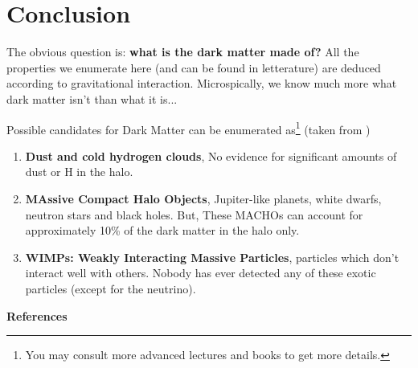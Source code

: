 \documentclass[12pt, letterpaper, twocolumn]{article}
\begin{document}
\section{\textbf{Conclusion}}

The obvious question is: \textbf{what is the dark matter made of?} All the properties we enumerate here (and can be found in letterature) are deduced according to gravitational interaction. Microspically, we know much more what dark matter isn't than what it is...

Possible candidates for Dark Matter can be enumerated as\footnote{You may consult more advanced lectures and books to get more details.} (taken from \cite{last})
\begin{enumerate}
\item \textbf{Dust and cold hydrogen clouds}, No evidence for significant amounts of dust or H in the halo. 
\item \textbf{MAssive Compact Halo Objects}, Jupiter-like planets, white dwarfs, neutron stars and black holes. But, These MACHOs can account for approximately 10\% of the dark matter in the halo only.
\item \textbf{WIMPs: Weakly Interacting Massive Particles}, particles which don't interact well with others. Nobody has ever detected any of these exotic particles (except for the neutrino).
\end{enumerate}

\vspace{0.125in}
\noindent\textbf{References}

\vspace{0.125in}
\printbibliography[heading=none]

\end{document}
